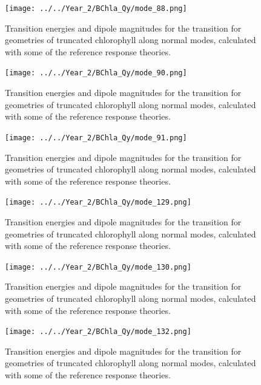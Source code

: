 \begin{figure}
    \centering
    \texttt{[image: ../../Year\_2/BChla\_Qy/mode\_88.png]}
    \label{fig:mode_88}
    \caption{Transition energies and dipole magnitudes for the \Qy transition for
    geometries of truncated chlorophyll along normal modes, calculated with some 
    of the reference response theories.}
\end{figure}

\begin{figure}
    \centering
    \texttt{[image: ../../Year\_2/BChla\_Qy/mode\_90.png]}
    \label{fig:mode_90}
    \caption{Transition energies and dipole magnitudes for the \Qy transition for
    geometries of truncated chlorophyll along normal modes, calculated with some 
    of the reference response theories.}
\end{figure}

\begin{figure}
    \centering
    \texttt{[image: ../../Year\_2/BChla\_Qy/mode\_91.png]}
    \label{fig:mode_91}
    \caption{Transition energies and dipole magnitudes for the \Qy transition for
    geometries of truncated chlorophyll along normal modes, calculated with some 
    of the reference response theories.}
\end{figure}

\begin{figure}
    \centering
    \texttt{[image: ../../Year\_2/BChla\_Qy/mode\_129.png]}
    \label{fig:mode_129}
    \caption{Transition energies and dipole magnitudes for the \Qy transition for
    geometries of truncated chlorophyll along normal modes, calculated with some 
    of the reference response theories.}
\end{figure}

\begin{figure}
    \centering
    \texttt{[image: ../../Year\_2/BChla\_Qy/mode\_130.png]}
    \label{fig:mode_130}
    \caption{Transition energies and dipole magnitudes for the \Qy transition for
    geometries of truncated chlorophyll along normal modes, calculated with some 
    of the reference response theories.}
\end{figure}

\begin{figure}
    \centering
    \texttt{[image: ../../Year\_2/BChla\_Qy/mode\_132.png]}
    \label{fig:mode_132}
    \caption{Transition energies and dipole magnitudes for the \Qy transition for
    geometries of truncated chlorophyll along normal modes, calculated with some 
    of the reference response theories.}
\end{figure}

